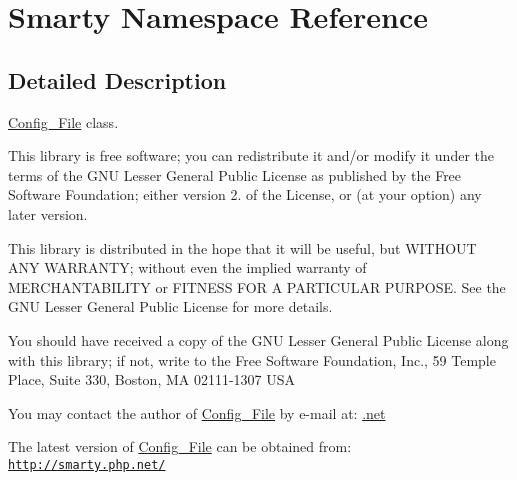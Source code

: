 \hypertarget{namespace_smarty}{\section{\-Smarty \-Namespace \-Reference}
\label{namespace_smarty}
}


\subsection{\-Detailed \-Description}
\hyperlink{class_config___file}{\-Config\-\_\-\-File} class.

\-This library is free software; you can redistribute it and/or modify it under the terms of the \-G\-N\-U \-Lesser \-General \-Public \-License as published by the \-Free \-Software \-Foundation; either version 2. of the \-License, or (at your option) any later version.

\-This library is distributed in the hope that it will be useful, but \-W\-I\-T\-H\-O\-U\-T \-A\-N\-Y \-W\-A\-R\-R\-A\-N\-T\-Y; without even the implied warranty of \-M\-E\-R\-C\-H\-A\-N\-T\-A\-B\-I\-L\-I\-T\-Y or \-F\-I\-T\-N\-E\-S\-S \-F\-O\-R \-A \-P\-A\-R\-T\-I\-C\-U\-L\-A\-R \-P\-U\-R\-P\-O\-S\-E. \-See the \-G\-N\-U \-Lesser \-General \-Public \-License for more details.

\-You should have received a copy of the \-G\-N\-U \-Lesser \-General \-Public \-License along with this library; if not, write to the \-Free \-Software \-Foundation, \-Inc., 59 \-Temple \-Place, \-Suite 330, \-Boston, \-M\-A 02111-\/1307 \-U\-S\-A

\-You may contact the author of \hyperlink{class_config___file}{\-Config\-\_\-\-File} by e-\/mail at\-: \hyperlink{}{.net}

\-The latest version of \hyperlink{class_config___file}{\-Config\-\_\-\-File} can be obtained from\-: \href{http://smarty.php.net/}{\tt http\-://smarty.\-php.\-net/}

